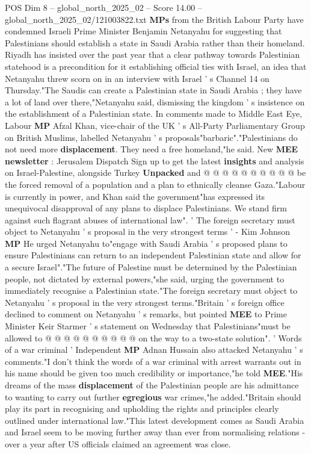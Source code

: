 \begin{textsample}{POS Dim 8 – global\_north\_2025\_02 – Score 14.00 – global\_north\_2025\_02/121003822.txt}  \label{ex:f8_pos_012}
\textbf{MPs} from the British Labour Party have condemned Israeli Prime Minister Benjamin Netanyahu for suggesting that Palestinians should establish a state in Saudi Arabia rather than their homeland.
Riyadh has insisted over the past year that a clear pathway towards Palestinian statehood is a precondition for it establishing official ties with Israel, an idea that Netanyahu threw scorn on in an interview with Israel ' s Channel 14 on Thursday."The Saudis can create a Palestinian state in Saudi Arabia ; they have a lot of land over there,"Netanyahu said, dismissing the kingdom ' s insistence on the establishment of a Palestinian state.
In comments made to Middle East Eye, Labour \textbf{MP} Afzal Khan, vice-chair of the UK ' s All-Party Parliamentary Group on British Muslims, labelled Netanyahu ' s proposals"barbaric"."Palestinians do not need more \textbf{displacement}.
They need a free homeland,"he said.
New \textbf{MEE} \textbf{newsletter} : Jerusalem Dispatch Sign up to get the latest \textbf{insights} and analysis on Israel-Palestine, alongside Turkey \textbf{Unpacked} and @ @ @ @ @ @ @ @ @ @ be the forced removal of a population and a plan to ethnically cleanse Gaza."Labour is currently in power, and Khan said the government"has expressed its unequivocal disapproval of any plans to displace Palestinians.
We stand firm against such flagrant abuses of international law". ' The foreign secretary must object to Netanyahu ' s proposal in the very strongest terms ' - Kim Johnson \textbf{MP} He urged Netanyahu to"engage with Saudi Arabia ' s proposed plans to ensure Palestinians can return to an independent Palestinian state and allow for a secure Israel"."The future of Palestine must be determined by the Palestinian people, not dictated by external powers,"she said, urging the government to immediately recognise a Palestinian state."The foreign secretary must object to Netanyahu ' s proposal in the very strongest terms."Britain ' s foreign office declined to comment on Netanyahu ' s remarks, but pointed \textbf{MEE} to Prime Minister Keir Starmer ' s statement on Wednesday that Palestinians"must be allowed to @ @ @ @ @ @ @ @ @ @ on the way to a two-state solution". ' Words of a war criminal ' Independent \textbf{MP} Adnan Hussain also attacked Netanyahu ' s comments."I don't think the words of a war criminal with arrest warrants out in his name should be given too much credibility or importance,"he told \textbf{MEE}."His dreams of the mass \textbf{displacement} of the Palestinian people are his admittance to wanting to carry out further \textbf{egregious} war crimes,"he added."Britain should play its part in recognising and upholding the rights and principles clearly outlined under international law."This latest development comes as Saudi Arabia and Israel seem to be moving further away than ever from normalising relations - over a year after US officials claimed an agreement was close.

\end{textsample}

